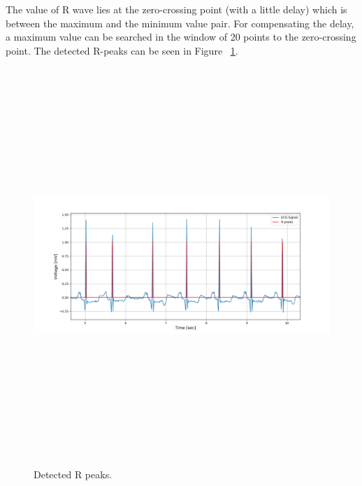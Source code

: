 The value of R wave lies at the zero-crossing point (with a little delay) which is between the maximum and the minimum value pair. For compensating the delay, a maximum value can be searched in the window of 20 points to the zero-crossing point. The detected R-peaks can be seen in Figure ~\ref{fig:r_peaks}.

\begin{figure}[htpb]
	\centering
	\includegraphics[width=15cm,height=15cm,keepaspectratio=true]{images/r_peaks}
	\caption{
		Detected R peaks.
	}
	\label{fig:r_peaks}
\end{figure}


